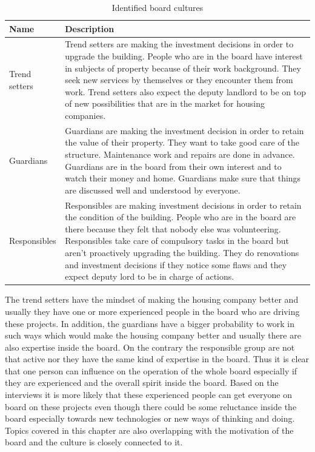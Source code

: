 \begin{table}
\begin{tabular}{|p{2.5cm}|p{9cm}|} 
\hline %
\textbf{Name} & \textbf{Description}  \\ 
\hline 
Trend setters & Trend setters are making the investment decisions in order to upgrade the building. People who are in the board have interest in subjects of property because of their work background. They seek new services by themselves or they encounter them from work. Trend setters also expect the deputy landlord to be on top of new possibilities that are in the market for housing companies. \\ 
\hline
Guardians & Guardians are making the investment decision in order to retain the value of their property. They want to take good care of the structure. Maintenance work and repairs are done in advance. Guardians are in the board from their own interest and to watch their money and home. Guardians make sure that things are discussed well and understood by everyone. \\  
\hline
Responsibles & Responsibles are making investment decisions in order to retain the condition of the building. People who are in the board are there because they felt that nobody else was volunteering. Responsibles take care of compulsory tasks in the board but aren't proactively upgrading the building. They do renovations and investment decisions if they notice some flaws and they expect deputy lord to be in charge of actions. \\
\hline
\end{tabular} %
\caption{Identified board cultures}
\label{table:culturetb}
\end{table} %

The trend setters have the mindset of making the housing company better and usually they have one or more experienced people in the board who are driving these projects. In addition, the guardians have a bigger probability to work in such ways which would make the housing company better and usually there are also expertise inside the board. On the contrary the responsible group are not that active nor they have the same kind of expertise in the board. Thus it is clear that one person can influence on the operation of the whole board especially if they are experienced and the overall spirit inside the board. Based on the interviews it is more likely that these experienced people can get everyone on board on these projects even though there could be some reluctance inside the board especially towards new technologies or new ways of thinking and doing. Topics covered in this chapter are also overlapping with the motivation of the board and the culture is closely connected to it.

